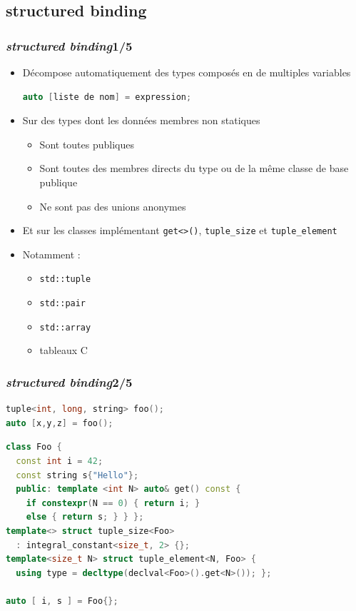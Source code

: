 \documentclass[C++.tex]{subfiles}
\begin{document}
\subsection*{structured binding}
\begin{frame}[fragile]
	\frametitle{\textit{structured binding}\titlehfill{}1/5}
	\begin{itemize}
		\item Décompose automatiquement des types composés en de multiples variables

		\begin{lstlisting}[language=C++]
auto [liste de nom] = expression;\end{lstlisting}

		\item Sur des types dont les données membres non statiques
		\begin{itemize}
			\item Sont toutes publiques
			\item Sont toutes des membres directs du type ou de la même classe de base publique
			\item Ne sont pas des unions anonymes
		\end{itemize}

		\item Et sur les classes implémentant \lstinline|get<>()|, \lstinline|tuple_size| et \lstinline|tuple_element|	
		
		\item Notamment : 
		\begin{itemize}
			\item \lstinline|std::tuple|
			\item \lstinline|std::pair|
			\item \lstinline|std::array|
			\item tableaux C
		\end{itemize}
	\end{itemize}
\end{frame}

\begin{frame}[fragile]
	\frametitle{\textit{structured binding}\titlehfill{}2/5}
	\begin{lstlisting}[language=C++]
tuple<int, long, string> foo();
auto [x,y,z] = foo();\end{lstlisting}

	\begin{lstlisting}[language=C++]
class Foo {
  const int i = 42;
  const string s{"Hello"}; 
  public: template <int N> auto& get() const {
    if constexpr(N == 0) { return i; }
    else { return s; } } };
template<> struct tuple_size<Foo>
  : integral_constant<size_t, 2> {};
template<size_t N> struct tuple_element<N, Foo> {
  using type = decltype(declval<Foo>().get<N>()); };

auto [ i, s ] = Foo{};\end{lstlisting}

\end{frame}
\end{document}
